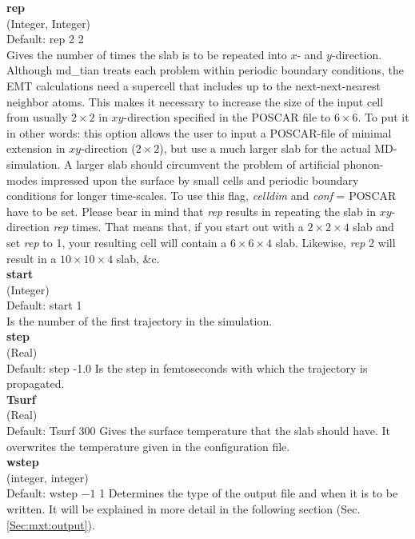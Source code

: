 \documentclass[twoside, 11pt, titlepage, captions=nooneline, a4paper, headsepline]{scrbook}%
\begin{document}
\noindent\textbf{rep}\\ 
(Integer, Integer)\\ 
Default: rep 2 2\\
Gives the number of times the slab is to be repeated into $x$- and $y$-direction. Although md\_tian treats each problem within periodic boundary conditions, the EMT calculations need a supercell that includes up to the next-next-nearest neighbor atoms. This makes it necessary to increase the size of the input cell from usually $2\times2$ in $xy$-direction specified in the POSCAR file to $6\times6$. To put it in other words: this option allows the user to input a POSCAR-file of minimal extension in $xy$-direction ($2\times2$), but use a much larger slab for the actual MD-simulation. A larger slab should circumvent the problem of artificial phonon-modes impressed upon the surface by small cells and periodic boundary conditions for longer time-scales. To use this flag, \textit{celldim} and \textit{conf} = POSCAR have to be set. Please bear in mind that \textit{rep} results in repeating the slab in $xy$-direction \textit{rep} times. That means that, if you start out with a $2\times2\times4$ slab and set \textit{rep} to 1, your resulting cell will contain a $6\times6\times4$ slab. Likewise, \textit{rep} 2 will result in a $10\times10\times4$ slab, \&c.\\  

\noindent\textbf{start}\\ 
(Integer)\\
Default: start 1\\
Is the number of the first trajectory in the simulation.\\

\noindent\textbf{step}\\ 
(Real)\\
Default: step -1.0
Is the step in femtoseconds with which the trajectory is propagated.\\

\noindent\textbf{Tsurf}\\ 
(Real)\\ 
Default: Tsurf 300
Gives the surface temperature that the slab should have. It overwrites the temperature given in the configuration file.\\

\noindent\textbf{wstep}\\
(integer, integer)\\ 
Default: wstep $-1$ 1
Determines the type of the output file and when it is to be written. It will be explained in more detail in the following section (Sec.\,\ref{Sec:mxt:output}).\\
\end{document}
